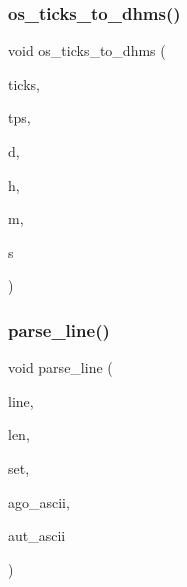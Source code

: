 \subsubsection{\texorpdfstring{os\+\_\+ticks\+\_\+to\+\_\+dhms()}{os\_ticks\_to\_dhms()}}
{\footnotesize\ttfamily void os\+\_\+ticks\+\_\+to\+\_\+dhms (\begin{DoxyParamCaption}\item[{\mbox{\hyperlink{galois_8h_a09fddde158a3a20bd2dcadb609de11dc}{I\+NT}}}]{ticks,  }\item[{\mbox{\hyperlink{galois_8h_a09fddde158a3a20bd2dcadb609de11dc}{I\+NT}}}]{tps,  }\item[{\mbox{\hyperlink{galois_8h_a09fddde158a3a20bd2dcadb609de11dc}{I\+NT}} \&}]{d,  }\item[{\mbox{\hyperlink{galois_8h_a09fddde158a3a20bd2dcadb609de11dc}{I\+NT}} \&}]{h,  }\item[{\mbox{\hyperlink{galois_8h_a09fddde158a3a20bd2dcadb609de11dc}{I\+NT}} \&}]{m,  }\item[{\mbox{\hyperlink{galois_8h_a09fddde158a3a20bd2dcadb609de11dc}{I\+NT}} \&}]{s }\end{DoxyParamCaption})}

\mbox{\label{util_8_c_a19b7001c6d761d06e3aa469ad260c9de}} 
\subsubsection{\texorpdfstring{parse\+\_\+line()}{parse\_line()}}
{\footnotesize\ttfamily void parse\+\_\+line (\begin{DoxyParamCaption}\item[{\mbox{\hyperlink{galois_8h_ab6cc7b4aeb6ea31aba2b3fbfc83ff5e6}{B\+Y\+TE}} $\ast$}]{line,  }\item[{\mbox{\hyperlink{galois_8h_a09fddde158a3a20bd2dcadb609de11dc}{I\+NT}} \&}]{len,  }\item[{\mbox{\hyperlink{galois_8h_a09fddde158a3a20bd2dcadb609de11dc}{I\+NT}} $\ast$\&}]{set,  }\item[{\mbox{\hyperlink{galois_8h_ab6cc7b4aeb6ea31aba2b3fbfc83ff5e6}{B\+Y\+TE}} $\ast$}]{ago\+\_\+ascii,  }\item[{\mbox{\hyperlink{galois_8h_ab6cc7b4aeb6ea31aba2b3fbfc83ff5e6}{B\+Y\+TE}} $\ast$}]{aut\+\_\+ascii }\end{DoxyParamCaption})}

